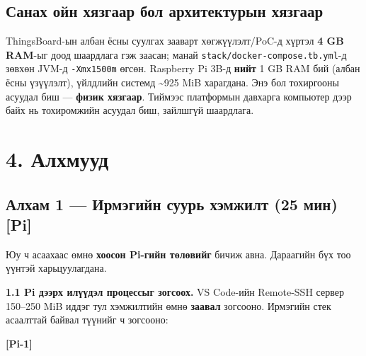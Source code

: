 \hypertarget{ux441ux430ux43dux430ux445-ux43eux439ux43d-ux445ux44fux437ux433ux430ux430ux440-ux431ux43eux43b-ux430ux440ux445ux438ux442ux435ux43aux442ux443ux440ux44bux43d-ux445ux44fux437ux433ux430ux430ux440}{%
\subsection{Санах ойн хязгаар бол архитектурын хязгаар}\label{ux441ux430ux43dux430ux445-ux43eux439ux43d-ux445ux44fux437ux433ux430ux430ux440-ux431ux43eux43b-ux430ux440ux445ux438ux442ux435ux43aux442ux443ux440ux44bux43d-ux445ux44fux437ux433ux430ux430ux440}}

ThingsBoard-ын албан ёсны суулгах зааварт хөгжүүлэлт/PoC-д хүртэл \textbf{4 GB RAM}-ыг доод шаардлага гэж заасан; манай \texttt{stack/\allowbreak{}docker-compose.\allowbreak{}tb.\allowbreak{}yml}-д зөвхөн JVM-д \texttt{-Xmx1500m} өгсөн. Raspberry Pi 3B-д \textbf{нийт} 1 GB RAM бий (албан ёсны үзүүлэлт), үйлдлийн системд \textasciitilde925 MiB харагдана. Энэ бол тохиргооны асуудал биш --- \textbf{физик хязгаар}. Тиймээс платформын давхарга компьютер дээр байх нь тохиромжийн асуудал биш, зайлшгүй шаардлага.

\hypertarget{ux430ux43bux445ux43cux443ux443ux434}{%
\section{4. Алхмууд}\label{ux430ux43bux445ux43cux443ux443ux434}}

\hypertarget{ux430ux43bux445ux430ux43c-1-ux438ux440ux43cux44dux433ux438ux439ux43d-ux441ux443ux443ux440ux44c-ux445ux44dux43cux436ux438ux43bux442-25-ux43cux438ux43d-pi}{%
\subsection{Алхам 1 --- Ирмэгийн суурь хэмжилт (25 мин) {[}Pi{]}}\label{ux430ux43bux445ux430ux43c-1-ux438ux440ux43cux44dux433ux438ux439ux43d-ux441ux443ux443ux440ux44c-ux445ux44dux43cux436ux438ux43bux442-25-ux43cux438ux43d-pi}}

Юу ч асаахаас өмнө \textbf{хоосон Pi-гийн төлөвийг} бичиж авна. Дараагийн бүх тоо үүнтэй харьцуулагдана.

\textbf{1.1 Pi дээрх илүүдэл процессыг зогсоох.} VS Code-ийн Remote-SSH сервер 150--250 MiB иддэг тул хэмжилтийн өмнө \textbf{заавал} зогсооно. Ирмэгийн стек асаалттай байвал түүнийг ч зогсооно:

\textbf{{[}Pi-1{]}}

\begin{Shaded}
\begin{Highlighting}[]
\KeywordTok{\&\&} 
\end{Highlighting}
\end{Shaded}

